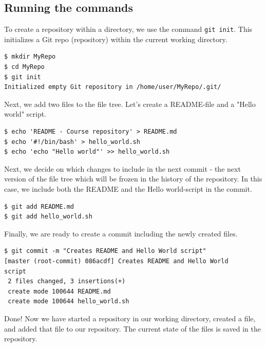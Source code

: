 \documentclass[../main/git_course_main.tex]{subfiles}
\begin{document}
\subsection{Running the commands}

To create a repository within a directory, we use the command \verb$git init$. This initializes a Git repo (repository) within the current working directory.

\begin{codebox}
\begin{lstlisting}
$ mkdir MyRepo
$ cd MyRepo
$ git init
Initialized empty Git repository in /home/user/MyRepo/.git/
\end{lstlisting}
\end{codebox}

Next, we add two files to the file tree. Let's create a README-file and a "Hello world" script.

\begin{codebox}
\begin{lstlisting}
$ echo 'README - Course repository' > README.md
$ echo '#!/bin/bash' > hello_world.sh
$ echo 'echo "Hello world"' >> hello_world.sh
\end{lstlisting}
\end{codebox}

Next, we decide on which changes to include in the next commit - the next version of the file tree which will be frozen in the history of the repository. In this case, we 
include both the README and the Hello world-script in the commit.

\begin{codebox}
\begin{lstlisting}
$ git add README.md
$ git add hello_world.sh
\end{lstlisting}
\end{codebox}

Finally, we are ready to create a commit including the newly created files.

\begin{codebox}
\begin{lstlisting}
$ git commit -m "Creates README and Hello World script"
[master (root-commit) 086acdf] Creates README and Hello World 
script
 2 files changed, 3 insertions(+)
 create mode 100644 README.md
 create mode 100644 hello_world.sh
\end{lstlisting}
\end{codebox}

Done! Now we have started a repository in our working directory, created a file, and added that file to our repository. The current state of the files is saved in the repository.
\end{document}
